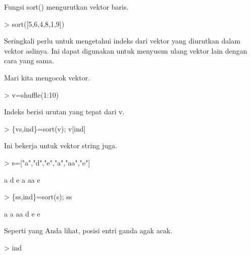 \documentclass[a4paper,10pt]{article}
\begin{document}
\begin{eulernotebook}
\begin{eulercomment}
\begin{eulercomment}
\begin{eulercomment}
\begin{eulercomment}
\begin{eulercomment}
\begin{eulercomment}
\begin{eulercomment}
Fungsi sort() mengurutkan vektor baris.
\end{eulercomment}
\begin{eulerprompt}
> sort([5,6,4,8,1,9])
\end{eulerprompt}
\begin{euleroutput}
  [1,  4,  5,  6,  8,  9]
\end{euleroutput}
\begin{eulercomment}
Seringkali perlu untuk mengetahui indeks dari vektor yang diurutkan
dalam vektor aslinya. Ini dapat digunakan untuk menyusun ulang vektor
lain dengan cara yang sama.

Mari kita mengocok vektor.
\end{eulercomment}
\begin{eulerprompt}
> v=shuffle(1:10)
\end{eulerprompt}
\begin{euleroutput}
  [4,  5,  10,  6,  8,  9,  1,  7,  2,  3]
\end{euleroutput}
\begin{eulercomment}
Indeks berisi urutan yang tepat dari v.
\end{eulercomment}
\begin{eulerprompt}
> \{vs,ind\}=sort(v); v[ind]
\end{eulerprompt}
\begin{euleroutput}
  [1,  2,  3,  4,  5,  6,  7,  8,  9,  10]
\end{euleroutput}
\begin{eulercomment}
Ini bekerja untuk vektor string juga.
\end{eulercomment}
\begin{eulerprompt}
> s=["a","d","e","a","aa","e"]
\end{eulerprompt}
\begin{euleroutput}
  a
  d
  e
  a
  aa
  e
\end{euleroutput}
\begin{eulerprompt}
> \{ss,ind\}=sort(s); ss
\end{eulerprompt}
\begin{euleroutput}
  a
  a
  aa
  d
  e
  e
\end{euleroutput}
\begin{eulercomment}
Seperti yang Anda lihat, posisi entri ganda agak acak.
\end{eulercomment}
\begin{eulerprompt}
> ind
\end{eulerprompt}
\begin{euleroutput}
  [4,  1,  5,  2,  6,  3]

\end{euleroutput}
\end{eulercomment}
\end{eulercomment}
\end{eulercomment}
\end{eulercomment}
\end{eulercomment}
\end{eulercomment}
\end{eulernotebook}
\end{document}

